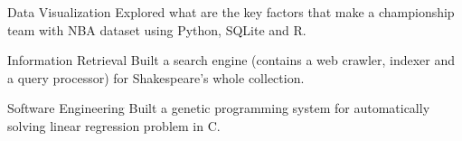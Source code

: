 \begin{cvskills}

  \cvskill
    {Data Visualization} %
    {Explored what are the key factors that make a championship team
    with NBA dataset using Python, SQLite and R.} %

  \cvskill
    {Information Retrieval} %
    {Built a search engine (contains a web crawler, indexer and a query
    processor) for Shakespeare's whole collection.} %

  \cvskill
    {Software Engineering} %
    {Built a genetic programming system for automatically solving
    linear regression problem in C.}

\end{cvskills}
